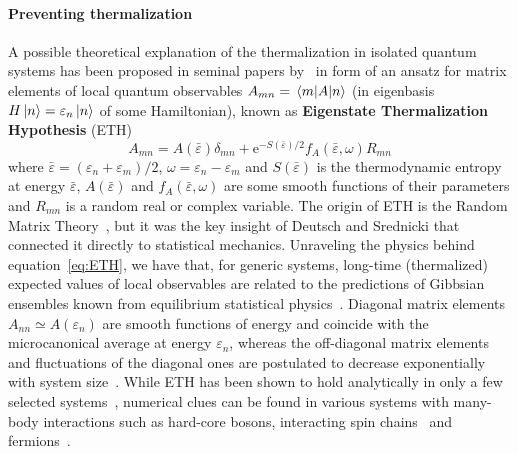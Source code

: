 \paragraph{Preventing thermalization} A possible theoretical explanation of the thermalization in isolated quantum systems
has been proposed in seminal papers by~\textcite{Deutsch1991,Srednicki1994} in form of an ansatz for matrix elements of
local quantum observables \(A_{mn} = \matrixel{m}{A}{n}\) (in eigenbasis \(H\ket{n}=\varepsilon_n \ket{n}\) of some Hamiltonian),
known as \textbf{Eigenstate Thermalization Hypothesis} (ETH)
\begin{equation}
    A_{mn} = A(\bar{\varepsilon}) \delta_{mn} + \mathrm{e}^{-S(\bar{\varepsilon})/2}f_{A}(\bar{\varepsilon},\omega)R_{mn}
    \label{eq:ETH}
\end{equation}
where \(\bar{\varepsilon} = (\varepsilon_n+\varepsilon_m)/2\), \(\omega=\varepsilon_n-\varepsilon_m\) and \(S(\bar{\varepsilon})\) is
the thermodynamic entropy at energy \(\bar{\varepsilon}\),  \(A(\bar{\varepsilon})\) and \(f_{A}(\bar{\varepsilon},\omega)\) are
some smooth functions of their parameters and
\(R_{mn}\) is a random real or complex variable. The origin of ETH is the Random Matrix Theory~\autocite{Wigner1955,Mehta2004},
but it was the key insight of Deutsch and Srednicki that connected it directly to statistical mechanics.
Unraveling the physics behind equation~\eqref{eq:ETH}, we have that, for generic systems,
long-time (thermalized) expected values of local observables are related to the predictions of Gibbsian ensembles
known from equilibrium statistical physics~\autocite{DAlessio2016}. Diagonal matrix elements \(A_{nn} \simeq A(\varepsilon_n)\) are smooth functions of energy and
coincide with the microcanonical average at energy \(\varepsilon_n\), whereas the off-diagonal matrix elements and fluctuations
of the diagonal ones are postulated to decrease exponentially with system size~\autocite{Beugeling2014}.
While ETH has been shown to hold analytically in only a few selected systems~\autocite{Magan2016}, numerical clues can be
found in various systems with many-body interactions such as hard-core bosons, interacting spin
chains~\autocite{Santos2010a,Rigol2010,Khatami2013,Rigol2009a} and fermions~\autocite{Neuenhahn2012,Rigol2009}.

